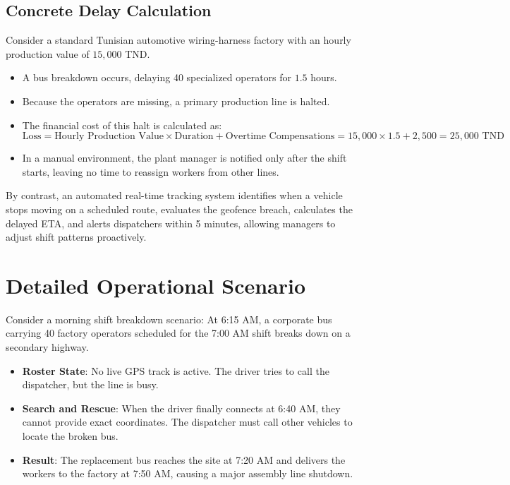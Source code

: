 \subsection{Concrete Delay Calculation}
Consider a standard Tunisian automotive wiring-harness factory with an hourly production value of $15,000$ TND. 
\begin{itemize}
  \item A bus breakdown occurs, delaying 40 specialized operators for $1.5$ hours.
  \item Because the operators are missing, a primary production line is halted.
  \item The financial cost of this halt is calculated as:
  \[\text{Loss} = \text{Hourly Production Value} \times \text{Duration} + \text{Overtime Compensations} = 15,000 \times 1.5 + 2,500 = 25,000 \text{ TND}\]
  \item In a manual environment, the plant manager is notified only after the shift starts, leaving no time to reassign workers from other lines.
\end{itemize}

By contrast, an automated real-time tracking system identifies when a vehicle stops moving on a scheduled route, evaluates the geofence breach, calculates the delayed ETA, and alerts dispatchers within 5 minutes, allowing managers to adjust shift patterns proactively.

\section{Detailed Operational Scenario}

Consider a morning shift breakdown scenario:
At 6:15 AM, a corporate bus carrying 40 factory operators scheduled for the 7:00 AM shift breaks down on a secondary highway.
\begin{itemize}
  \item \textbf{Roster State}: No live GPS track is active. The driver tries to call the dispatcher, but the line is busy.
  \item \textbf{Search and Rescue}: When the driver finally connects at 6:40 AM, they cannot provide exact coordinates. The dispatcher must call other vehicles to locate the broken bus.
  \item \textbf{Result}: The replacement bus reaches the site at 7:20 AM and delivers the workers to the factory at 7:50 AM, causing a major assembly line shutdown.
\end{itemize}

